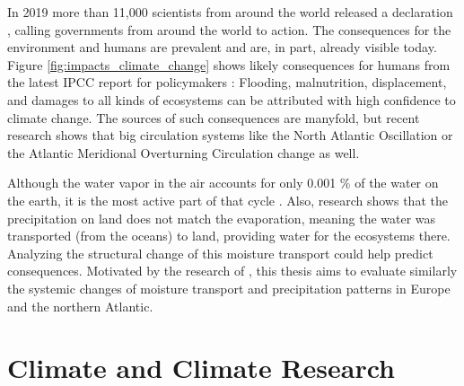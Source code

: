 In 2019 more than 11,000  scientists from around the world released a declaration \cite{ripple_world_2019}, calling governments from around the world to action.
The consequences for the environment and humans are prevalent and are, in part, already visible today. 
Figure \ref{fig:impacts_climate_change} shows likely consequences for humans from the latest IPCC report for policymakers \cite{lee2024climate}: Flooding, malnutrition, displacement, and damages to all kinds of ecosystems can be attributed with high confidence to climate change. 
The sources of such consequences are manyfold, but recent research shows that big circulation systems like the North Atlantic Oscillation\cite{vietinghoff_visual_2021} or the Atlantic Meridional Overturning Circulation \cite{lobelle_detectability_2020} change as well. 

Although the water vapor in the air accounts for only 0.001 \% of the water on the earth, it is the most active part of that cycle \cite{zou_investigating_2020}. 
Also, research shows that the precipitation on land does not match the evaporation, meaning the water was transported (from the oceans) to land, providing water for the ecosystems there.  
Analyzing the structural change of this moisture transport could help predict consequences. 
Motivated by the research of \citeauthor{vietinghoff_visual_2021}, this thesis aims to evaluate similarly the systemic changes of moisture transport and precipitation patterns in Europe and the northern Atlantic. 


\section{Climate and Climate Research}
\label{sec:climate}




